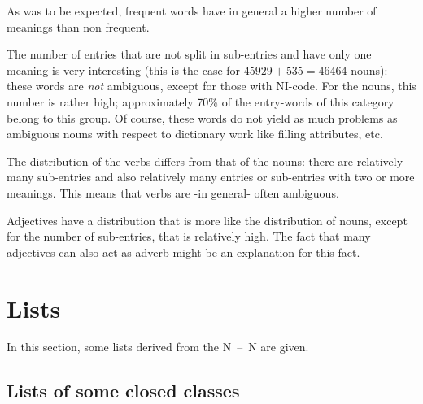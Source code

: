 As was to be expected, frequent words have in general a higher number of 
meanings than non frequent.

The number of entries that are not split in sub-entries and have only one
meaning is very interesting (this is the case for $45929 + 535 = 46464$ nouns):
these words are {\em not}
ambiguous, except for those with NI-code. For the nouns, this number is rather 
high;
approximately 70\% of the entry-words of this category belong to this 
group. Of course, these words do not yield as much problems as
ambiguous nouns with respect to dictionary work like filling attributes, etc.

The distribution of the verbs differs from that of the nouns: there are 
relatively many sub-entries and also relatively many entries or sub-entries 
with two or more 
meanings. This means that verbs are -in general- often ambiguous.

Adjectives have a distribution that is more like the distribution of nouns,
except for the number of sub-entries, that is relatively high. The fact that 
many adjectives can also act as adverb might be an explanation for this fact.
\newpage
\section{Lists}
In this section, some lists derived from the N~--~N are given.

\subsection{Lists of some closed classes}

